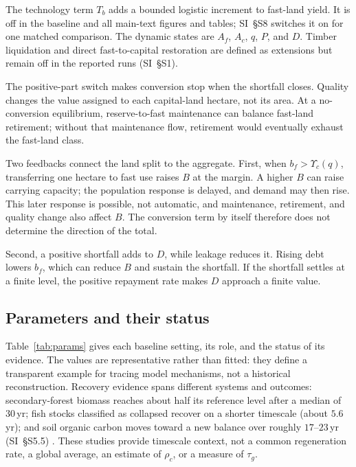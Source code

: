 \documentclass[preprint,12pt,authoryear]{elsarticle}
\newcommand{\Ups}{\Upsilon_c}
\begin{document}
The technology term $T_b$ adds a bounded logistic increment to fast-land yield. It is off in the baseline and all main-text figures and tables; SI~\S S8 switches it on for one matched comparison. The dynamic states are $A_f$, $A_c$, $q$, $P$, and $D$. Timber liquidation and direct fast-to-capital restoration are defined as extensions but remain off in the reported runs (SI~\S S1).

The positive-part switch makes conversion stop when the shortfall closes. Quality changes the value assigned to each capital-land hectare, not its area. At a no-conversion equilibrium, reserve-to-fast maintenance can balance fast-land retirement; without that maintenance flow, retirement would eventually exhaust the fast-land class.

Two feedbacks connect the land split to the aggregate. First, when $b_f>\Ups(q)$, transferring one hectare to fast use raises $B$ at the margin. A higher $B$ can raise carrying capacity; the population response is delayed, and demand may then rise. This later response is possible, not automatic, and maintenance, retirement, and quality change also affect $B$. The conversion term by itself therefore does not determine the direction of the total.

Second, a positive shortfall adds to $D$, while leakage reduces it. Rising debt lowers $b_f$, which can reduce $B$ and sustain the shortfall. If the shortfall settles at a finite level, the positive repayment rate makes $D$ approach a finite value.

\subsection{Parameters and their status}\label{sec:params}

Table~\ref{tab:params} gives each baseline setting, its role, and the status of its evidence. The values are representative rather than fitted: they define a transparent example for tracing model mechanisms, not a historical reconstruction. Recovery evidence spans different systems and outcomes: secondary-forest biomass reaches about half its reference level after a median of $30$\,yr; fish stocks classified as collapsed recover on a shorter timescale (about $5.6$\,yr); and soil organic carbon moves toward a new balance over roughly $17$--$23$\,yr (SI~\S S5.5) \citep{Poorter2016,HutchingsReynolds2004,Neubauer2013,Poeplau2011}. These studies provide timescale context, not a common regeneration rate, a global average, an estimate of $\rho_c$, or a measure of $\tau_g$.
\end{document}
